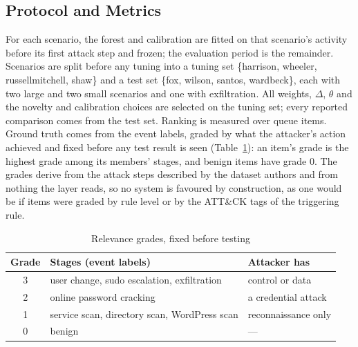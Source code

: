 \documentclass[conference]{IEEEtran}
\begin{document}
\subsection{Protocol and Metrics}
\label{sec:protocol}

For each scenario, the forest and calibration are fitted on that scenario's activity before its first attack step and frozen; the evaluation period is the remainder. Scenarios are split before any tuning into a tuning set \{harrison, wheeler, russellmitchell, shaw\} and a test set \{fox, wilson, santos, wardbeck\}, each with two large and two small scenarios and one with exfiltration. All weights, $\Delta$, $\theta$ and the novelty and calibration choices are selected on the tuning set; every reported comparison comes from the test set. Ranking is measured over queue items. Ground truth comes from the event labels, graded by what the attacker's action achieved and fixed before any test result is seen (Table~\ref{tab:grades}): an item's grade is the highest grade among its members' stages, and benign items have grade 0. The grades derive from the attack steps described by the dataset authors and from nothing the layer reads, so no system is favoured by construction, as one would be if items were graded by rule level or by the ATT\&CK tags of the triggering rule.

\begin{table}[t]
\caption{Relevance grades, fixed before testing}
\label{tab:grades}
\centering\footnotesize
\begin{tabular}{@{}c p{4.1cm} p{2.6cm}@{}}
\toprule
\textbf{Grade} & \textbf{Stages (event labels)} & \textbf{Attacker has} \\
\midrule
3 & user change, sudo escalation, exfiltration & control or data \\
2 & online password cracking & a credential attack \\
1 & service scan, directory scan, WordPress scan & reconnaissance only \\
0 & benign & --- \\
\bottomrule
\end{tabular}
\end{table}
\end{document}

